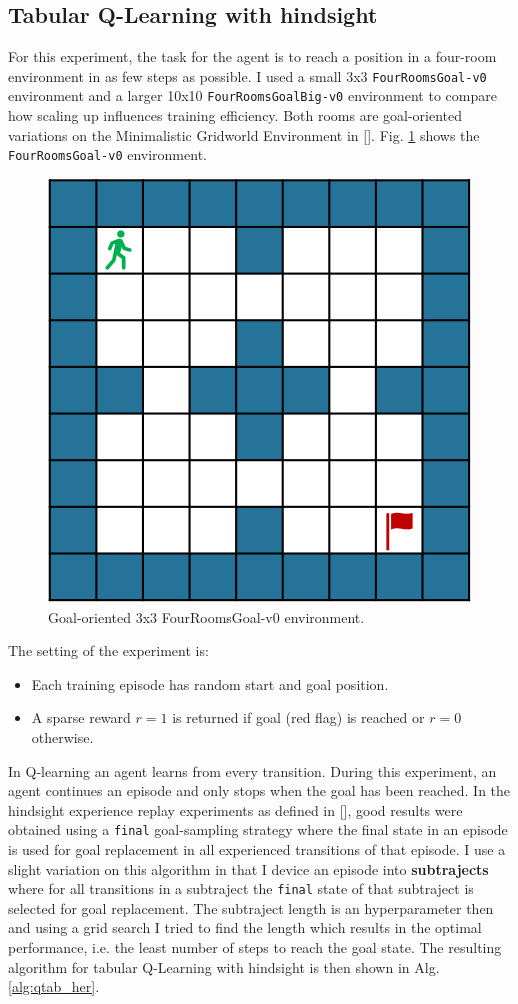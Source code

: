 \documentclass[conference]{IEEEtran}
\begin{document}
\subsection{Tabular Q-Learning with hindsight} \label{subsec:exp_tab_her}
For this experiment, the task for the agent is to reach a position in a four-room environment in as few steps as possible. I used a small 3x3 \texttt{FourRoomsGoal-v0} environment and a larger 10x10 \texttt{FourRoomsGoalBig-v0} environment to compare how scaling up influences training efficiency. Both rooms are goal-oriented variations on the Minimalistic Gridworld Environment in [\cite{gym_minigrid}]. Fig. \ref{fig:tabular_fourroomsgoal_env} shows the \texttt{FourRoomsGoal-v0} environment.
\begin{figure}[ht]
\centering
\includegraphics[width=0.5\columnwidth]{img/FourRoomsGoal-v0.png}
\caption{Goal-oriented 3x3 FourRoomsGoal-v0 environment.}
\label{fig:tabular_fourroomsgoal_env}
\end{figure}
The setting of the experiment is:
\begin{itemize}
    \item Each training episode has random start and goal position.
    \item A sparse reward $r = 1$ is returned if goal (red flag) is reached or $r = 0$ otherwise.
\end{itemize}
In Q-learning an agent learns from every transition. During this experiment, an agent continues an episode and only stops when the goal has been reached.
In the hindsight experience replay experiments as defined in [\cite{andrychowicz2017hindsight}], good results were obtained using a \texttt{final} goal-sampling strategy where the final state in an episode is used for goal replacement in all experienced transitions of that episode. I use a slight variation on this algorithm in that I device an episode into \textbf{subtrajects} where for all transitions in a subtraject the \texttt{final} state of that subtraject is selected for goal replacement. The subtraject length is an hyperparameter then and using a grid search I tried to find the length which results in the optimal performance, i.e. the least number of steps to reach the goal state. The resulting algorithm for tabular Q-Learning with hindsight is then shown in Alg. \ref{alg:qtab_her}.
\end{document}
